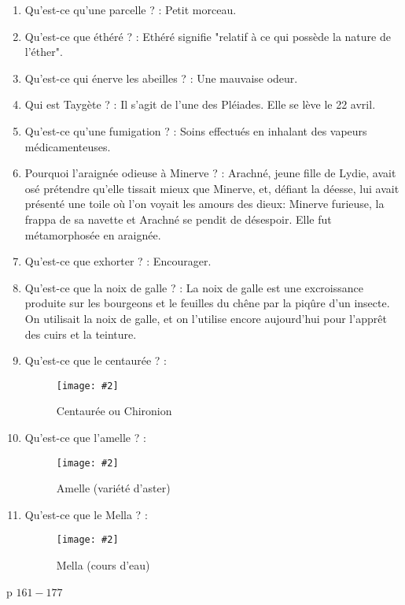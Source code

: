 \documentclass[a4paper, 11pt, hidelinks]{article}
\newcommand{\img}[4]{\begin{figure}[!ht]
    \centering
    \texttt{[image: \#2]}
    \caption{#3}
    \label{#4}
    \end{figure} }
\begin{document}
\begin{enumerate}
      \item Qu'est-ce qu'une parcelle ? : Petit morceau.
      \item Qu'est-ce que éthéré ? : Ethéré signifie "relatif à ce qui possède la nature de l'éther".
      \item Qu'est-ce qui énerve les abeilles ? : Une mauvaise odeur.
      \item Qui est Taygète ? : Il s'agit de l'une des Pléiades. Elle se lève le 22 avril.
      \item Qu'est-ce qu'une fumigation ? : Soins effectués en inhalant des vapeurs médicamenteuses.
      \item Pourquoi l'araignée odieuse à Minerve ? : Arachné, jeune fille de Lydie, avait osé prétendre qu'elle tissait mieux que Minerve, et, défiant la déesse, lui avait présenté une toile où
            l'on voyait les amours des dieux: Minerve furieuse, la frappa de sa navette et Arachné se pendit de désespoir. Elle fut métamorphosée en araignée.
      \item Qu'est-ce que exhorter ? : Encourager.
      \item Qu'est-ce que la noix de galle ? : La noix de galle est une excroissance produite sur les bourgeons et le feuilles du chêne par la piqûre d'un insecte. On utilisait la noix de galle, et on l'utilise encore aujourd'hui pour l'apprêt des cuirs et la teinture.
      \item Qu'est-ce que le centaurée ? : 
            \img{0.1}{Centaurée.jpg}{Centaurée ou Chironion}{143}
      \item Qu'est-ce que l'amelle ? : 
            \img{0.2}{Amelle.jpg}{Amelle (variété d'aster)}{144}
            \newpage
      \item Qu'est-ce que le Mella ? : 
            \img{0.3}{Mella.png}{Mella (cours d'eau)}{145}
\end{enumerate}

p $161 - 177$
\end{document}
